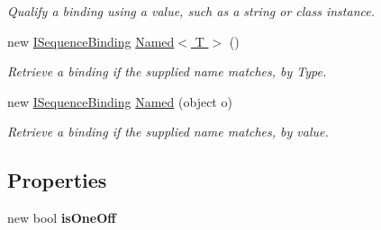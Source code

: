\begin{DoxyCompactItemize}
\begin{DoxyCompactList}\small\item\em Qualify a binding using a value, such as a string or class instance. \end{DoxyCompactList}\item 
\hypertarget{classstrange_1_1extensions_1_1sequencer_1_1impl_1_1_sequence_binding_aaed5a3824efef63ae9088aa52496825b}{new \hyperlink{interfacestrange_1_1extensions_1_1sequencer_1_1api_1_1_i_sequence_binding}{I\-Sequence\-Binding} \hyperlink{classstrange_1_1extensions_1_1sequencer_1_1impl_1_1_sequence_binding_aaed5a3824efef63ae9088aa52496825b}{Named$<$ T $>$} ()}\label{classstrange_1_1extensions_1_1sequencer_1_1impl_1_1_sequence_binding_aaed5a3824efef63ae9088aa52496825b}

\begin{DoxyCompactList}\small\item\em Retrieve a binding if the supplied name matches, by Type. \end{DoxyCompactList}\item 
\hypertarget{classstrange_1_1extensions_1_1sequencer_1_1impl_1_1_sequence_binding_a8ee8defb082cae2f33cbe36ad0795eef}{new \hyperlink{interfacestrange_1_1extensions_1_1sequencer_1_1api_1_1_i_sequence_binding}{I\-Sequence\-Binding} \hyperlink{classstrange_1_1extensions_1_1sequencer_1_1impl_1_1_sequence_binding_a8ee8defb082cae2f33cbe36ad0795eef}{Named} (object o)}\label{classstrange_1_1extensions_1_1sequencer_1_1impl_1_1_sequence_binding_a8ee8defb082cae2f33cbe36ad0795eef}

\begin{DoxyCompactList}\small\item\em Retrieve a binding if the supplied name matches, by value. \end{DoxyCompactList}\end{DoxyCompactItemize}
\subsection*{Properties}
\begin{DoxyCompactItemize}
\item 
\hypertarget{classstrange_1_1extensions_1_1sequencer_1_1impl_1_1_sequence_binding_a93d2933bd23236e8d0dafbea9f646a96}{new bool {\bfseries is\-One\-Off}}\label{classstrange_1_1extensions_1_1sequencer_1_1impl_1_1_sequence_binding_a93d2933bd23236e8d0dafbea9f646a96}

\end{DoxyCompactItemize}
